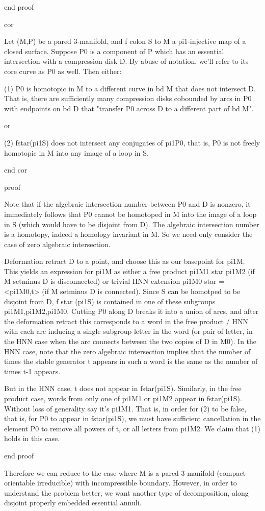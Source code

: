 end proof

cor

Let (M,P) be a pared 3-manifold, and f colon S to M a pi1-injective map of
a closed surface. Suppose P0 is a component of P which has an essential
intersection with a compression disk D. By abuse of notation, we'll refer to
its core curve as P0 as well. Then either:

(1) P0 is homotopic in M to a different curve in bd M that does not intersect
D. That is, there are sufficiently many compression disks cobounded by arcs in
P0 with endpoints on bd D that "transfer P0 across D to a different part of bd
M".

or

(2) fstar(pi1S) does not intersect any conjugates of pi1P0, that is, P0 is not
freely homotopic in M into any image of a loop in S.

end cor

proof

Note that if the algebraic intersection number between P0 and D is nonzero, it
immediately follows that P0 cannot be homotoped in M into the image of a loop
in S (which would have to be disjoint from D). The algebraic intersection
number is a homotopy, indeed a homology invariant in M. So we need only
consider the case of zero algebraic intersection.

Deformation retract D to a point, and choose this as our basepoint for pi1M.
This yields an expression for pi1M as either a free product pi1M1 star pi1M2
(if M setminus D is disconnected) or trivial HNN extension pi1M0 star
= <pi1M0,t> (if M setminus D is connected). Since S can be homotped to be
disjoint from D, f star (pi1S) is contained in one of these subgroups
pi1M1,pi1M2,pi1M0.  Cutting P0 along D breaks it into a union of arcs, and
after the deformation retract this corresponds to a word in the free product
/ HNN with each arc inducing a single subgroup letter in the word (or pair of
letter, in the HNN case when the arc connects between the two copies of D in
M0).  In the HNN case, note that the zero algebraic intersection implies that
the number of times the stable generator t appears in such a word is the same
as the number of times t-1 appears.

But in the HNN case, t does not appear in fstar(pi1S).  Similarly, in the free
product case, words from only one of pi1M1 or pi1M2 appear in fstar(pi1S).
Without loss of generality say it's pi1M1. That is, in order for (2) to be
false, that is, for P0 to appear in fstar(pi1S), we must have sufficient
cancellation in the element P0 to remove all powers of t, or all letters from
pi1M2. We claim that (1) holds in this case.



end proof

Therefore we can reduce to the case where M is a pared 3-manifold (compact
orientable irreducible) with incompressible boundary. However, in order to
understand the problem better, we want another type of decomposition, along
disjoint properly embedded essential annuli.


